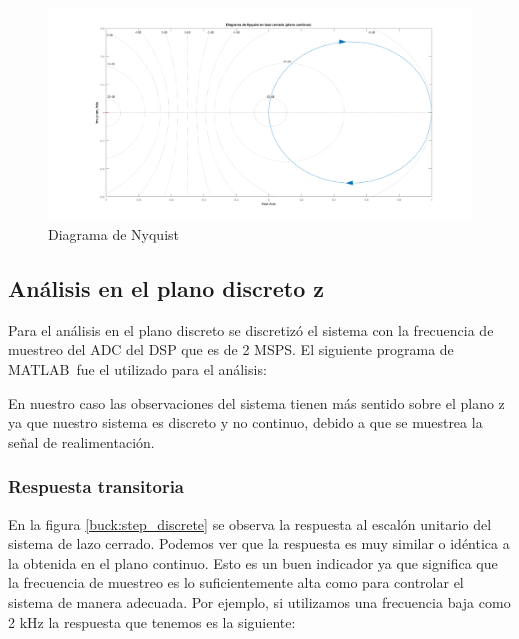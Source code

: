 \documentclass[12pt]{report}
\begin{document}
	\begin{figure}
		\centering
		\includegraphics[width=\textwidth,height=\textheight,keepaspectratio]{buck_nyquist} 
		\caption{Diagrama de Nyquist}
		\label{buck:nyquist}
	\end{figure}

	\newpage
	\subsection{Análisis en el plano discreto z}

	Para el análisis en el plano discreto se discretizó el sistema con la frecuencia de muestreo del ADC del DSP que es de 2 MSPS. El siguiente programa de MATLAB\textregistered \ fue el utilizado para el análisis:
	
	
	
	En nuestro caso las observaciones del sistema tienen más sentido sobre el plano z ya que nuestro sistema es discreto y no continuo, debido a que se muestrea la señal de realimentación. 
	
	\subsubsection{Respuesta transitoria}
	
	En la figura \ref{buck:step_discrete} se observa la respuesta al escalón unitario del sistema de lazo cerrado. Podemos ver que la respuesta es muy similar o idéntica a la obtenida en el plano continuo. Esto es un buen indicador ya que significa que la frecuencia de muestreo es lo suficientemente alta como para controlar el sistema de manera adecuada. Por ejemplo, si utilizamos una frecuencia baja como 2 kHz la respuesta que tenemos es la siguiente:
	
\end{document}
